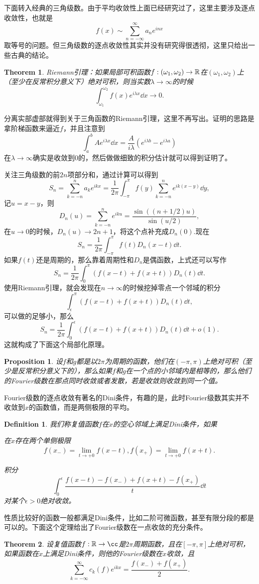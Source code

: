 \documentclass[10pt]{book}
\theoremstyle{plain}%
\newtheorem{pro}{Proposition}[chapter]%
\newtheorem{defi}{Definition}[chapter]%
\newtheorem{theo}{Theorem}[chapter]%
\begin{document}
下面转入经典的三角级数。由于平均收敛性上面已经研究过了，这里主要涉及逐点收敛性，也就是
\[
	f(x)\sim\sum_{n=-\infty}^\infty a_n e^{inx}
\]
取等号的问题。但三角级数的逐点收敛性其实并没有研究得很透彻，这里只给出一些古典的结论。

\begin{theo}
Riemann引理：如果局部可积函数$f:(\omega_1,\omega_2)\to \mathbb{R}$在$(\omega_1,\omega_2)$上（至少在反常积分意义下）绝对可积，则当实数$\lambda \to \infty$的时候
	\[
		\int_{\omega_1}^{\omega_2}f(x)e^{i\lambda x}\dd x \to 0.
	\]
\end{theo}
分离实部虚部就得到关于三角函数的Riemann引理，这里不再写出。证明的思路是拿阶梯函数来逼近$f$，并且注意到
	\[
		\int_a^bAe^{i\lambda x}\dd x=\frac{A}{i\lambda}(e^{i\lambda b}-e^{i\lambda a})
	\]
在$\lambda \to \infty$确实是收敛到0的，然后做做细致的积分估计就可以得到证明了。

关注三角级数的前$2n$项部分和，通过计算可以得到
\[
	S_n=\sum_{k=-n}^n a_k e^{ikx}=\frac{1}{2\pi}\int_{-\pi}^{\pi}f(y)\sum_{k=-n}^n e^{ik(x-y)}\dd y,
\]
记$u=x-y$，则
\[
	D_n(u)=\sum_{k=-n}^n e^{iku}=\frac{\sin ((n+1/2)u)}{\sin(u/2)},
\]
在$u\to 0$的时候，$D_n(u)\to 2n+1$，将这个点补充成$D_n(0)$.现在
\[
	S_n=\frac{1}{2\pi}\int_{-\pi}^{\pi}f(t)D_n(x-t)\dd t.
\]
如果$f(t)$还是周期的，那么靠着周期性和$D_n$是偶函数，上式还可以写作
\[
	S_n=\frac{1}{2\pi}\int^{\pi}_{0}(f(x-t)+f(x+t))D_n(t)\dd t.
\]
使用Riemann引理，就会发现在$n\to \infty$的时候挖掉零点一个邻域的积分
\[
	\int^{\pi}_{\epsilon}(f(x-t)+f(x+t))D_n(t)\dd t,
\]
可以做的足够小，那么
\[
	S_n=\frac{1}{2\pi}\int^{\epsilon}_{0}(f(x-t)+f(x+t))D_n(t)\dd t+o(1).
\]
这就构成了下面这个局部化原理。
\begin{pro}
设$f$和$g$都是以$2\pi$为周期的函数，他们在$(-\pi,\pi)$上绝对可积（至少是反常积分意义下的），那么如果$f$和$g$在一个点的小邻域内是相等的，那么他们的Fourier级数在那点同时收敛或者发散，若是收敛则收敛到同一个值。
\end{pro}
Fourier级数的逐点收敛有著名的Dini条件，有趣的是，此时Fourier级数其实并不收敛到$x$的函数值，而是两侧极限的平均。
\begin{defi}
我们称复值函数$f$在$x$的空心邻域上满足Dini条件，如果

在$x$存在两个单侧极限
\[
	f(x_-)=\lim_{t\to+0}f(x-t),f(x_+)=\lim_{t\to+0}f(x+t).
\]

积分
\[
\int_0^\epsilon\frac{f(x-t)-f(x_-)+f(x+t)-f(x_+)}{t}\dd t
\]
对某个$\epsilon>0$绝对收敛。
\end{defi}
性质比较好的函数一般都满足Dini条件，比如二阶可微函数，甚至有限分段的都是可以的。下面这个定理给出了Fourier级数在一点收敛的充分条件。
\begin{theo}
设复值函数$f:\rr\to\cc$是$2\pi$周期函数，且在$[-\pi,\pi]$上绝对可积，如果函数在$x$上满足Dini条件，则他的Fourier级数在$x$收敛，且
\[
	\sum_{k=-\infty}^\infty c_k(f)e^{ikx}=\frac{f(x_-)+f(x_+)}{2}.
\]
\end{theo}
\end{document}
